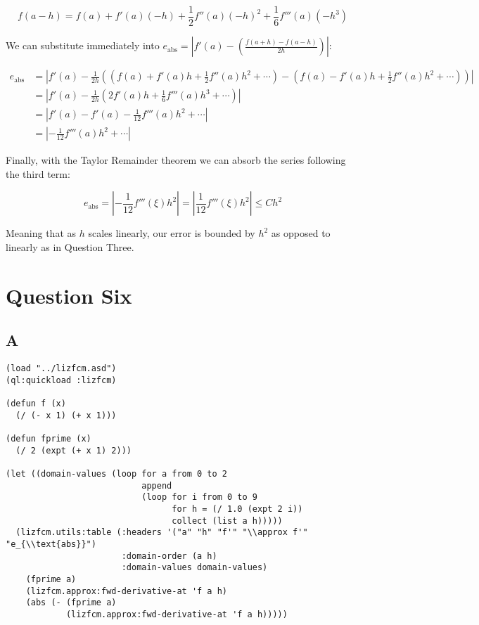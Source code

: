 \documentclass[11pt]{article}
\begin{document}
\begin{equation*}
f(a - h) = f(a) + f'(a)(-h) + \frac{1}{2}f''(a)(-h)^2 + \frac{1}{6}f'''(a)(-h^3)
\end{equation*}

We can substitute immediately into \(e_{\text{abs}} = |f'(a) - (\frac{f(a+h) - f(a-h)}{2h})|\):

\begin{align*}
e_{\text{abs}} &= |f'(a) - \frac{1}{2h}((f(a) + f'(a)h + \frac{1}{2}f''(a)h^2 + \cdots) - (f(a) - f'(a)h + \frac{1}{2}f''(a)h^2 + \cdots))| \\
&= |f'(a) - \frac{1}{2h}(2f'(a)h + \frac{1}{6}f'''(a)h^3 + \cdots)| \\
&= |f'(a) - f'(a) - \frac{1}{12}f'''(a)h^2 + \cdots| \\
&= |-\frac{1}{12}f'''(a)h^2 + \cdots|
\end{align*}

Finally, with the Taylor Remainder theorem we can absorb the series following the third term:

\begin{equation*}
e_{\text{abs}} = |-\frac{1}{12}f'''(\xi)h^2| = |\frac{1}{12}f'''(\xi)h^2| \leq Ch^2
\end{equation*}

Meaning that as \(h\) scales linearly, our error is bounded by \(h^2\) as opposed to linearly as in Question Three.

\section{Question Six}
\label{sec:org7b05811}
\subsection{A}
\label{sec:org8341a77}
\begin{verbatim}
(load "../lizfcm.asd")
(ql:quickload :lizfcm)

(defun f (x)
  (/ (- x 1) (+ x 1)))

(defun fprime (x)
  (/ 2 (expt (+ x 1) 2)))

(let ((domain-values (loop for a from 0 to 2
                           append 
                           (loop for i from 0 to 9
                                 for h = (/ 1.0 (expt 2 i))
                                 collect (list a h)))))
  (lizfcm.utils:table (:headers '("a" "h" "f'" "\\approx f'" "e_{\\text{abs}}")
                       :domain-order (a h)
                       :domain-values domain-values)
    (fprime a)
    (lizfcm.approx:fwd-derivative-at 'f a h)
    (abs (- (fprime a)
            (lizfcm.approx:fwd-derivative-at 'f a h)))))
\end{verbatim}
\end{document}
